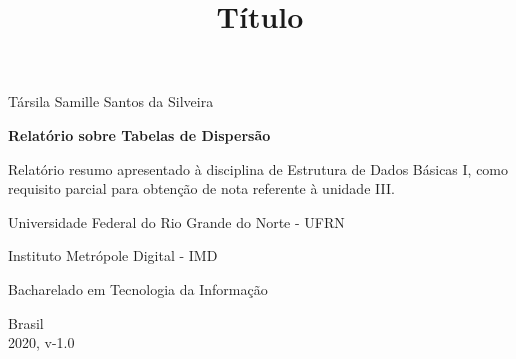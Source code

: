 \documentclass[a4paper, 12pt]{article}
\begin{document}
	\begin{titlepage}
		\begin{center}
			
			
			\large{Társila Samille Santos da Silveira}\\ 
			\vspace{15pt}
			
			\vspace{85pt}
			
			\textbf{\LARGE{Relatório sobre Tabelas de Dispersão}}
			\title{\large{Título}}
			
		\end{center}
		\vspace{1,5cm}
		
		\begin{flushright}
			
			\begin{list}{}{
					\setlength{\leftmargin}{4.5cm}
					\setlength{\rightmargin}{0cm}
					\setlength{\labelwidth}{0pt}
					\setlength{\labelsep}{\leftmargin}}
				
				\item Relatório resumo apresentado à disciplina de Estrutura de Dados Básicas I, como requisito parcial para obtenção de nota referente à unidade III.
				
				
			\end{list}
		\end{flushright}
	\vspace{3cm}
\begin{center}{}
	
	
	
	\item Universidade Federal do Rio Grande do Norte - UFRN \
	\item Instituto Metrópole Digital - IMD \
	\item Bacharelado em Tecnologia da Informação\
	
\end{center}		


		\begin{center}
					\vspace{\fill}
		Brasil\\
		2020, v-1.0
		\end{center}
	\end{titlepage}
	\newpage
	\newpage
	\tableofcontents
	\thispagestyle{empty}
	
\end{document}
